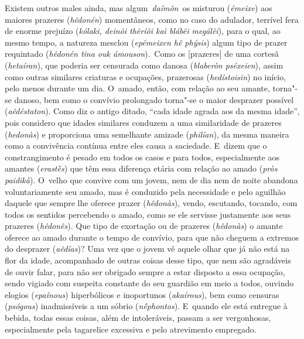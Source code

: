 Existem outros males ainda, mas algum~\emph{daímôn}~os misturou
(\emph{émeixe}) aos maiores prazeres (\emph{hêdonén}) momentâneos,
\bekker{[240b]} como no caso do adulador, terrível fera de enorme prejuízo
(\emph{kólaki, deinôi thêríôi kaì blábêi megálêi}), para o qual, ao
mesmo tempo, a natureza mesclou (\emph{epémeixen hê phýsis}) algum tipo
de prazer requintado (\emph{hêdonén tina ouk ámouson}).~Como os
[prazeres] de uma cortesã (\emph{hetaíran}), que poderia ser
censurada como danosa (\emph{blaberòn pséxeien}), assim como outras
similares criaturas e ocupações, prazerosas (\emph{hedístoisin}) no
início, pelo menos durante um dia. O~amado, então, com relação ao seu
amante, torna"-se danoso, bem como o convívio prolongado torna"-se o maior
desprazer possível (\emph{aêdéstaton}). \bekker{[240c]} Como diz o antigo
ditado, ``cada idade agrada aos da mesma idade'', pois considero que
idades similares conduzem a uma similaridade de prazeres
(\emph{hedonàs}) e proporciona uma semelhante amizade (\emph{philían}),
da mesma maneira como a convivência contínua entre eles causa a
saciedade. E~dizem que o constrangimento é pesado em todos os casos e
para todos, especialmente aos amantes (\emph{erastḕs}) que têm essa
diferença etária com relação ao amado (\emph{pròs paidikà}). O~velho que
convive com um jovem, nem de dia nem de noite abandona voluntariamente
seu amado, \bekker{[240d]} mas é conduzido pela necessidade e pelo aguilhão
daquele que sempre lhe oferece prazer (\emph{hêdonàs}), vendo,
escutando, tocando, com todos os sentidos percebendo o amado, como se
ele servisse justamente aos seus prazeres (\emph{hêdonês}). Que tipo de
exortação ou de prazeres (\emph{hêdonàs}) o amante oferece ao amado
durante o tempo de convívio, para que não cheguem a extremos do
desprazer (\emph{aêdías})? Uma vez que o jovem vê aquele olhar que já
não está na flor da idade, acompanhado de outras coisas desse tipo, que
nem são agradáveis de ouvir falar, \bekker{[240e]} para não ser obrigado
sempre a estar disposto a essa ocupação, sendo vigiado com suspeita
constante do seu guardião em meio a todos, ouvindo elogios
(\emph{epaínous}) hiperbólicos e inoportunos (\emph{akaírous}), bem como
censuras (\emph{psógous}) inadmissíveis a um sóbrio (\emph{nḗphontos}).
E~quando ele está entregue à bebida, todas essas coisas, além de
intoleráveis, passam a ser vergonhosas, especialmente pela tagarelice
excessiva e pelo atrevimento empregado.

